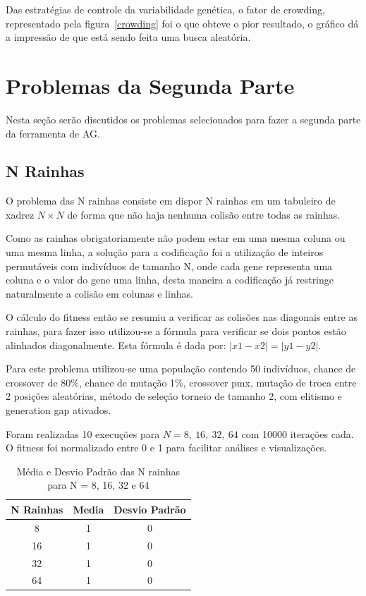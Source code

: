 \documentclass[12pt]{article}
\begin{document}
Das estratégias de controle da variabilidade genética, o fator de crowding, representado 
pela figura~\ref{crowding} foi o que obteve o pior resultado, o gráfico dá a impressão 
de que está sendo feita uma busca aleatória.

\section{Problemas da Segunda Parte}

Nesta seção serão discutidos os problemas selecionados para fazer a segunda parte da 
ferramenta de AG.

\subsection{N Rainhas}

O problema das N rainhas consiste em dispor N rainhas em um tabuleiro de xadrez 
$N \times N$ de forma que não haja nenhuma colisão entre todas as rainhas.

Como as rainhas obrigatoriamente não podem estar em uma mesma coluna ou uma mesma linha, 
a solução para a codificação foi a utilização de inteiros permutáveis com indivíduos de 
tamanho N, onde cada gene representa uma coluna e o valor do gene uma linha, desta maneira 
a codificação já restringe naturalmente a colisão em colunas e linhas.

O cálculo do fitness então se resumiu a verificar as colisões nas diagonais entre as 
rainhas, para fazer isso utilizou-se a fórmula para verificar se dois pontos estão
alinhados diagonalmente. Esta fórmula é dada por: $|x1 - x2| = |y1 - y2|$.

Para este problema utilizou-se uma população contendo 50 indivíduos, chance de crossover 
de 80\%, chance de mutação 1\%, crossover pmx, mutação de troca entre 2 posições 
aleatórias, método de seleção torneio de tamanho 2, com elitismo e generation gap 
ativados.

Foram realizadas 10 execuções para $N = 8,\ 16,\ 32,\ 64$ com 10000 iterações cada. O 
fitness foi normalizado entre 0 e 1 para facilitar análises e visualizações.

\begin{table}[]
\centering
\caption{Média e Desvio Padrão das N rainhas para N = 8, 16, 32 e 64}
\label{nqueenstable}
\begin{tabular}{|c|c|c|}
\hline
\textbf{N Rainhas} & \textbf{Media} & \textbf{Desvio Padrão} \\ \hline
8                  & 1              & 0                      \\ \hline
16                 & 1              & 0                      \\ \hline
32                 & 1              & 0                      \\ \hline
64                 & 1              & 0                      \\ \hline
\end{tabular}
\end{table}
\end{document}
